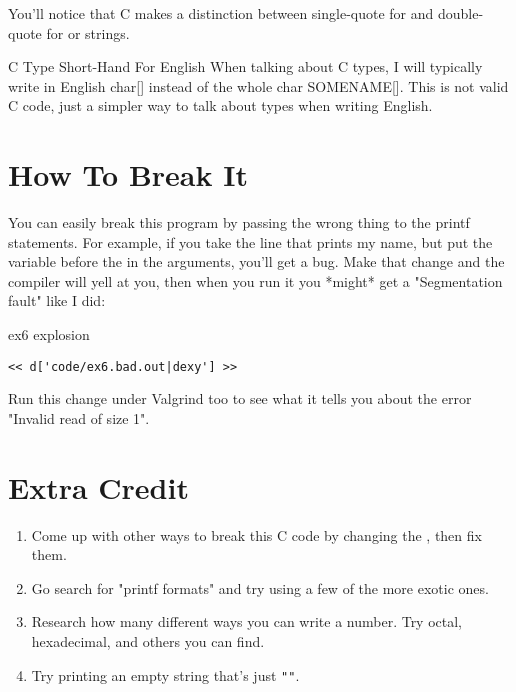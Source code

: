 You'll notice that C makes a distinction between single-quote for 
and double-quote for  or strings.


\begin{aside}{C Type Short-Hand For English}
When talking about C types, I will typically write in English char[] instead of the whole char SOMENAME[].
This is not valid C code, just a simpler way to talk about types when writing English.
\end{aside}

\section{How To Break It}

You can easily break this program by passing the wrong thing to the 
printf statements.  For example, if you take the line that prints
my name, but put the  variable before the 
in the arguments, you'll get a bug.  Make that change and the compiler will
yell at you, then when you run it you *might* get a "Segmentation fault"
like I did:

\begin{code}{ex6 explosion}
\begin{lstlisting}
<< d['code/ex6.bad.out|dexy'] >>
\end{lstlisting}
\end{code}

Run this change under Valgrind too to see what it tells you about
the error "Invalid read of size 1".

\section{Extra Credit}

\begin{enumerate}
\item Come up with other ways to break this C code by changing the
    , then fix them.
\item Go search for "printf formats" and try using a few of the
    more exotic ones.
\item Research how many different ways you can write a number. Try
    octal, hexadecimal, and others you can find.
\item Try printing an empty string that's just \verb|""|.
\end{enumerate}

